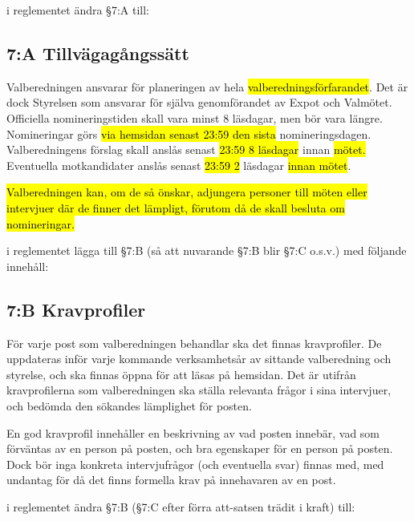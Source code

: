 \documentclass[../_main/handlingar.tex]{subfiles}
\begin{document}
\begin{attsatser}
    \att i reglementet ändra \S7:A till:\par
        \subsection*{7:A Tillvägagångssätt}
        Valberedningen ansvarar för planeringen av hela \hl{valberedningsförfarandet}. Det är dock Styrelsen som ansvarar för själva genomförandet av Expot och Valmötet. Officiella nomineringstiden skall vara minst 8 läsdagar, men bör vara längre. Nomineringar görs \hl{via hemsidan senast 23:59 den sista} nomineringsdagen. Valberedningens förslag skall anslås senast \hl{23:59 8 läsdagar} innan \hl{mötet. }Eventuella motkandidater anslås senast \hl{23:59 2} läsdagar \hl{innan mötet}.

        \hl{Valberedningen kan, om de så önskar, adjungera personer till möten eller intervjuer där de finner det lämpligt, förutom då de skall besluta om nomineringar.}

    \changenote

    \att i reglementet lägga till \S7:B (så att nuvarande \S7:B blir \S7:C o.s.v.) med följande innehåll:
        \subsection*{7:B Kravprofiler}
        För varje post som valberedningen behandlar ska det finnas kravprofiler. De uppdateras inför varje kommande verksamhetsår av sittande valberedning och styrelse, och ska finnas öppna för att läsas på hemsidan. Det är utifrån kravprofilerna som valberedningen ska ställa relevanta frågor i sina intervjuer, och bedömda den sökandes lämplighet för posten.

        En god kravprofil innehåller en beskrivning av vad posten innebär, vad som förväntas av en person på posten, och bra egenskaper för en person på posten. Dock bör inga konkreta intervjufrågor (och eventuella svar) finnas med, med undantag för då det finns formella krav på innehavaren av en post.

    \newpage

    \att i reglementet ändra \S7:B (\S7:C efter förra att-satsen trädit i kraft) till:\par

\end{attsatser}
\end{document}
